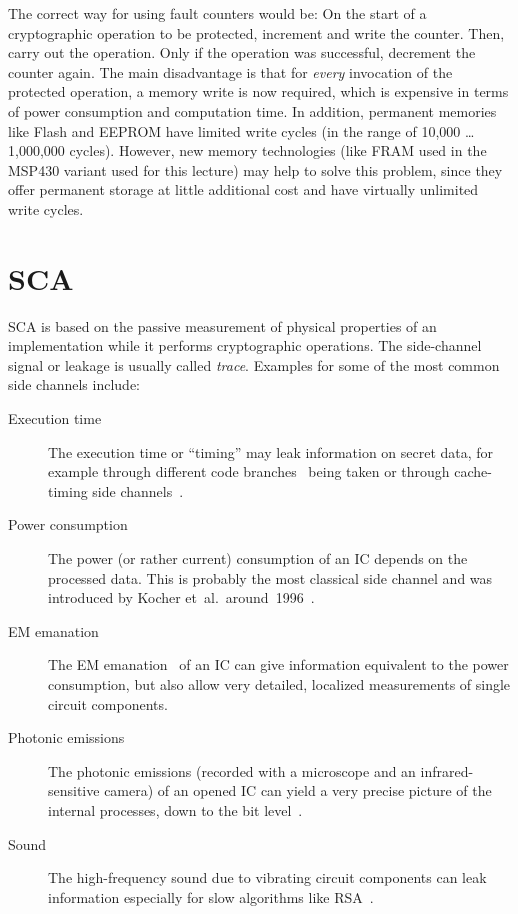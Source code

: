 The correct way for using fault counters would be: On the start of a cryptographic operation to be protected, increment and write the counter. Then, carry out the operation. Only if the operation was successful, decrement the counter again. The main disadvantage is that for \emph{every} invocation of the protected operation, a memory write is now required, which is expensive in terms of power consumption and computation time. In addition, permanent memories like Flash and \ac{EEPROM} have limited write cycles (in the range of 10,000 \ldots 1,000,000 cycles). However, new memory technologies (like \ac{FRAM} used in the MSP430 variant used for this lecture) may help to solve this problem, since they offer permanent storage at little additional cost and have virtually unlimited write cycles.

\section{\acl{SCA}}
\label{sec:impl_attacks:sca}
\acf{SCA} is based on the passive measurement of physical properties of an implementation while it performs cryptographic operations. The side-channel signal or leakage is usually called \emph{trace}. Examples for some of the most common side channels include:

\begin{description}
	\item[Execution time] The execution time or ``timing'' may leak information on secret data, for example through different code branches~\cite{timing_kocher} being taken or through cache-timing side channels~\cite{bernstein2005cache}.
	
	\item[Power consumption] The power (or rather current) consumption of an \ac{IC} depends on the processed data. This is probably the most classical side channel and was introduced by Kocher et~al.~around~1996~\cite{dpa_kocher}.
	
	\item[\ac{EM} emanation] The \ac{EM} emanation~\cite{AgrawalARR02} of an \ac{IC} can give information equivalent to the power consumption, but also allow very detailed, localized measurements of single circuit components. 
	
	\item[Photonic emissions] The photonic emissions (recorded with a microscope and an infrared-sensitive camera) of an opened \ac{IC} can yield a very precise picture of the internal processes, down to the bit level~\cite{aesBlinks,Schl12}.
	
	\item[Sound] The high-frequency sound due to vibrating circuit components can leak information especially for slow algorithms like \ac{RSA}~\cite{acoustic_sca_rsa}.
\end{description}

